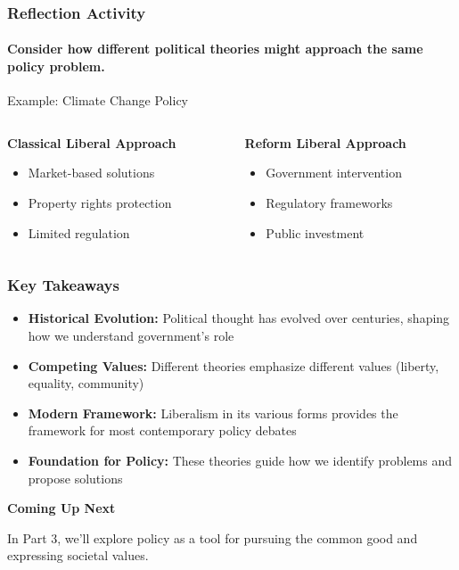 \documentclass[10pt]{beamer}
\begin{document}
\begin{frame}
\frametitle{Reflection Activity}
\framesubtitle{Consider how different political theories might approach the same policy problem.}

\begin{block}{Example: Climate Change Policy}
\begin{columns}
\begin{column}{0.48\textwidth}
\textbf{Classical Liberal Approach}
\begin{itemize}
\item Market-based solutions
\item Property rights protection
\item Limited regulation
\end{itemize}
\end{column}

\begin{column}{0.48\textwidth}
\textbf{Reform Liberal Approach}
\begin{itemize}
\item Government intervention
\item Regulatory frameworks
\item Public investment
\end{itemize}
\end{column}
\end{columns}
\end{block}

\end{frame}

\begin{frame}
\frametitle{Key Takeaways}

\begin{block}{}
\begin{itemize}
\item \textbf{Historical Evolution:} Political thought has evolved over centuries, shaping how we understand government's role
\item \textbf{Competing Values:} Different theories emphasize different values (liberty, equality, community)
\item \textbf{Modern Framework:} Liberalism in its various forms provides the framework for most contemporary policy debates
\item \textbf{Foundation for Policy:} These theories guide how we identify problems and propose solutions
\end{itemize}
\end{block}

\pause
\vspace{1cm}
\begin{center}
\textbf{Coming Up Next}

In Part 3, we'll explore policy as a tool for pursuing the common good and expressing societal values.
\end{center}

\end{frame}
\end{document}
